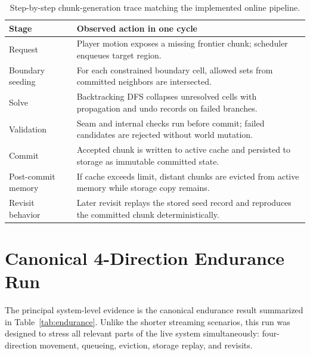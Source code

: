\documentclass[12pt,a4paper]{report}
\begin{document}
\begin{table}[H]
\centering
\small
\begin{tabular}{p{2.6cm} p{8.0cm}}
\toprule
Stage & Observed action in one cycle \\
\midrule
Request & Player motion exposes a missing frontier chunk; scheduler enqueues target region. \\
Boundary seeding & For each constrained boundary cell, allowed sets from committed neighbors are intersected. \\
Solve & Backtracking DFS collapses unresolved cells with propagation and undo records on failed branches. \\
Validation & Seam and internal checks run before commit; failed candidates are rejected without world mutation. \\
Commit & Accepted chunk is written to active cache and persisted to storage as immutable committed state. \\
Post-commit memory & If cache exceeds limit, distant chunks are evicted from active memory while storage copy remains. \\
Revisit behavior & Later revisit replays the stored seed record and reproduces the committed chunk deterministically. \\
\bottomrule
\end{tabular}
\caption{Step-by-step chunk-generation trace matching the implemented online pipeline.}
\label{tab:chunk-trace}
\end{table}

\section{Canonical 4-Direction Endurance Run}
The principal system-level evidence is the canonical endurance result summarized in Table~\ref{tab:endurance}. Unlike the shorter streaming scenarios, this run was designed to stress all relevant parts of the live system simultaneously: four-direction movement, queueing, eviction, storage replay, and revisits.
\end{document}
